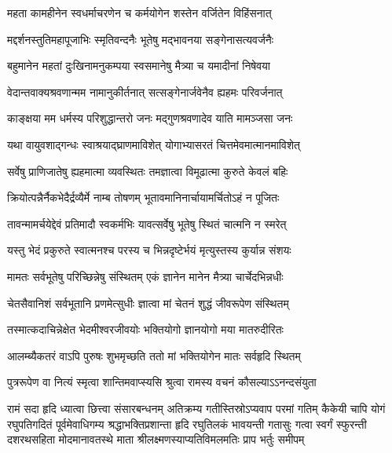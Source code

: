 \twolineshloka
{महता कामहीनेन स्वधर्माचरणेन च}
{कर्मयोगेन शस्तेन वर्जितेन विहिंसनात्} %

\twolineshloka
{मद्दर्शनस्तुतिमहापूजाभिः स्मृतिवन्दनैः}
{भूतेषु मद्भावनया सङ्गेनासत्यवर्जनैः} %

\twolineshloka
{बहुमानेन महतां दुःखिनामनुकम्पया}
{स्वसमानेषु मैत्र्या च यमादीनां निषेवया} %

\twolineshloka
{वेदान्तवाक्यश्रवणान्मम नामानुकीर्तनात्}
{सत्सङ्गेनार्जवेनैव ह्यहमः परिवर्जनात्} %

\twolineshloka
{काङ्क्षया मम धर्मस्य परिशुद्धान्तरो जनः}
{मद्गुणश्रवणादेव याति मामञ्जसा जनः} %

\twolineshloka
{यथा वायुवशाद्गन्धः स्वाश्रयाद्\mbox{}घ्राणमाविशेत्}
{योगाभ्यासरतं चित्तमेवमात्मानमाविशेत्} %

\twolineshloka
{सर्वेषु प्राणिजातेषु ह्यहमात्मा व्यवस्थितः}
{तमज्ञात्वा विमूढात्मा कुरुते केवलं बहिः} %

\twolineshloka
{क्रियोत्पन्नैर्नैकभेदैर्द्रव्यैर्मे नाम्ब तोषणम्}
{भूतावमानिनार्चायामर्चितोऽहं न पूजितः} %

\twolineshloka
{तावन्मामर्चयेद्देवं प्रतिमादौ स्वकर्मभिः}
{यावत्सर्वेषु भूतेषु स्थितं चात्मनि न स्मरेत्} %

\twolineshloka
{यस्तु भेदं प्रकुरुते स्वात्मनश्च परस्य च}
{भिन्नदृष्टेर्भयं मृत्युस्तस्य कुर्यान्न संशयः} %

\twolineshloka
{मामतः सर्वभूतेषु परिच्छिन्नेषु संस्थितम्}
{एकं ज्ञानेन मानेन मैत्र्या चार्चेदभिन्नधीः} %

\twolineshloka
{चेतसैवानिशं सर्वभूतानि प्रणमेत्सुधीः}
{ज्ञात्वा मां चेतनं शुद्धं जीवरूपेण संस्थितम्} %

\twolineshloka
{तस्मात्कदाचिन्नेक्षेत भेदमीश्वरजीवयोः}
{भक्तियोगो ज्ञानयोगो मया मातरुदीरितः} %

\twolineshloka
{आलम्ब्यैकतरं वाऽपि पुरुषः शुभमृच्छति}
{ततो मां भक्तियोगेन मातः सर्वहृदि स्थितम्} %

\twolineshloka
{पुत्ररूपेण वा नित्यं स्मृत्वा शान्तिमवाप्स्यसि}
{श्रुत्वा रामस्य वचनं कौसल्याऽऽनन्दसंयुता} %

\twolineshloka
{रामं सदा हृदि ध्यात्वा छित्त्वा संसारबन्धनम्}
{अतिक्रम्य गतीस्तिस्रोऽप्यवाप परमां गतिम्} %
\setlength{\shlokaspaceskip}{10pt}
\fourlineindentedshloka
{कैकेयी चापि योगं रघुपतिगदितं पूर्वमेवाधिगम्य}
{श्रद्धाभक्तिप्रशान्ता हृदि रघुतिलकं भावयन्ती गतासुः}
{गत्वा स्वर्गं स्फुरन्ती दशरथसहिता मोदमानावतस्थे}
{माता श्रीलक्ष्मणस्याप्यतिविमलमतिः प्राप भर्तुः समीपम्} %
\setlength{\shlokaspaceskip}{24pt}



